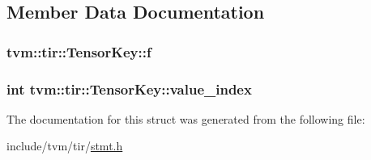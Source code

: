 \subsection{Member Data Documentation}
\subsubsection[{\texorpdfstring{f}{f}}]{ tvm\+::tir\+::\+Tensor\+Key\+::f}\hypertarget{structtvm_1_1tir_1_1TensorKey_a9d56077c3df0c3e5f17c1c68b443c731}{}\label{structtvm_1_1tir_1_1TensorKey_a9d56077c3df0c3e5f17c1c68b443c731}
\subsubsection[{\texorpdfstring{value\+\_\+index}{value_index}}]{\setlength{\rightskip}{0pt plus 5cm}int tvm\+::tir\+::\+Tensor\+Key\+::value\+\_\+index}\hypertarget{structtvm_1_1tir_1_1TensorKey_a3c59c45fbf5331aafcb0be4c824eae0c}{}\label{structtvm_1_1tir_1_1TensorKey_a3c59c45fbf5331aafcb0be4c824eae0c}


The documentation for this struct was generated from the following file\+:\begin{DoxyCompactItemize}
\item 
include/tvm/tir/\hyperlink{stmt_8h}{stmt.\+h}\end{DoxyCompactItemize}
